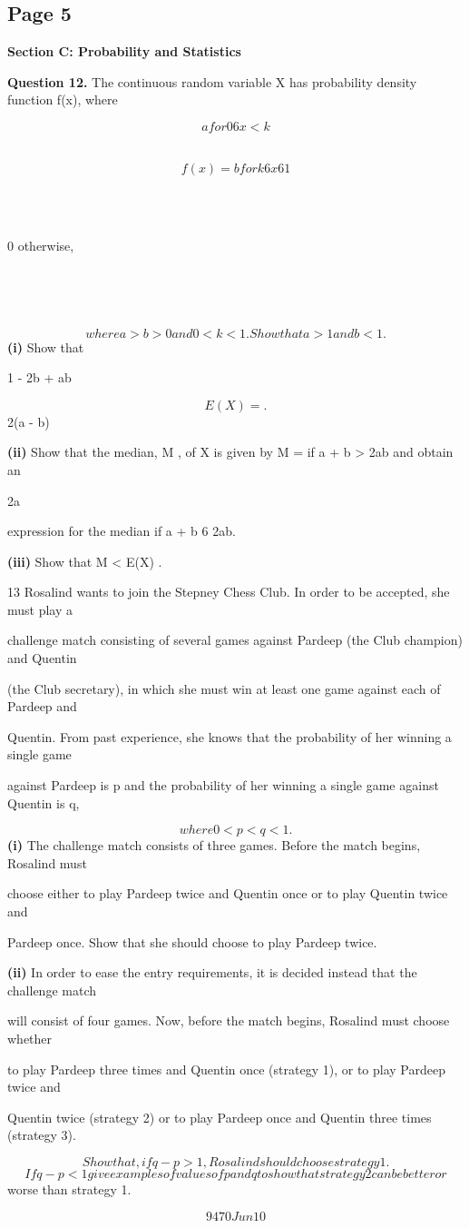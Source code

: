 \documentclass[12pt]{article}
\begin{document}
\subsection*{Page 5}
\begin{flushleft}
\bigskip\textbf{Section C: Probability and Statistics}\par
\bigskip\textbf{Question 12.} The continuous random variable X has probability density function f(x), where\par
\[a for 0 6 x < k\]
\par
\[f(x) = b for k 6 x 6 1\]
\par
\par
0 otherwise,\par
\par
\par
\[where a > b > 0 and 0 < k < 1. Show that a > 1 and b < 1.\]
\textbf{(i)} Show that\par
1 - 2b + ab\par
\[E(X) = .\]
2(a - b)\par
\textbf{(ii)} Show that the median, M , of X is given by M = if a + b > 2ab and obtain an\par
2a\par
expression for the median if a + b 6 2ab.\par
\textbf{(iii)} Show that M < E(X) .\par
13 Rosalind wants to join the Stepney Chess Club. In order to be accepted, she must play a\par
challenge match consisting of several games against Pardeep (the Club champion) and Quentin\par
(the Club secretary), in which she must win at least one game against each of Pardeep and\par
Quentin. From past experience, she knows that the probability of her winning a single game\par
against Pardeep is p and the probability of her winning a single game against Quentin is q,\par
\[where 0 < p < q < 1.\]
\textbf{(i)} The challenge match consists of three games. Before the match begins, Rosalind must\par
choose either to play Pardeep twice and Quentin once or to play Quentin twice and\par
Pardeep once. Show that she should choose to play Pardeep twice.\par
\textbf{(ii)} In order to ease the entry requirements, it is decided instead that the challenge match\par
will consist of four games. Now, before the match begins, Rosalind must choose whether\par
to play Pardeep three times and Quentin once (strategy 1), or to play Pardeep twice and\par
Quentin twice (strategy 2) or to play Pardeep once and Quentin three times (strategy 3).\par
\[Show that, if q - p > 1 , Rosalind should choose strategy 1.\]
\[If q - p < 1 give examples of values of p and q to show that strategy 2 can be better or\]
worse than strategy 1.\par
\[9470 Jun10\]
\end{flushleft}
\end{document}
